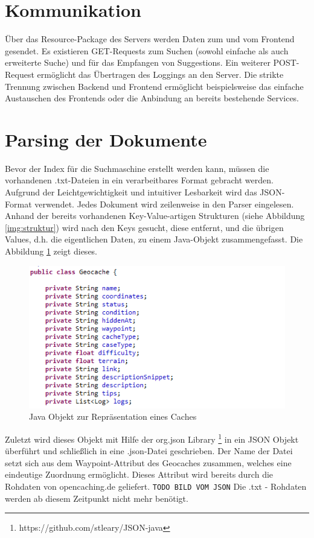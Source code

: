\documentclass[11pt,a4paper]{scrreprt}
\renewcommand\emph[1]{\colorbox{light-gray}{\texttt{#1}}}
\begin{document}
\section{Kommunikation}
Über das Resource-Package des Servers werden Daten zum und vom Frontend gesendet. Es existieren GET-Requests zum Suchen (sowohl einfache als auch erweiterte Suche) und für das Empfangen von Suggestions. Ein weiterer POST-Request ermöglicht das Übertragen des Loggings an den Server. Die strikte Trennung zwischen Backend und Frontend ermöglicht beispielsweise das einfache Austauschen des Frontends oder die Anbindung an bereits bestehende Services.

\section{Parsing der Dokumente}
Bevor der Index für die Suchmaschine erstellt werden kann, müssen die vorhandenen .txt-Dateien in ein verarbeitbares Format gebracht werden. Aufgrund der Leichtgewichtigkeit und intuitiver Lesbarkeit wird das JSON-Format verwendet.
Jedes Dokument wird zeilenweise in den Parser eingelesen. Anhand der bereits vorhandenen Key-Value-artigen Strukturen (siehe Abbildung \ref{img:struktur}) wird nach den Keys gesucht, diese entfernt, und die übrigen Values, d.h. die eigentlichen Daten, zu einem Java-Objekt zusammengefasst. Die Abbildung \ref{img:objekt} zeigt dieses. 

\begin{figure}
	\centering
	\includegraphics[height=0.3\textheight]{cache_objekt.png}
	\caption{Java Objekt zur Repräsentation eines Caches}
	\label{img:objekt}
\end{figure}

Zuletzt wird dieses Objekt mit Hilfe der org.json Library \footnote{https://github.com/stleary/JSON-java} in ein JSON Objekt überführt und schließlich in eine .json-Datei geschrieben. Der Name der Datei setzt sich aus dem Waypoint-Attribut des Geocaches zusammen, welches eine eindeutige Zuordnung ermöglicht. Dieses Attribut wird bereits durch die Rohdaten von opencaching.de geliefert. \emph{TODO BILD VOM JSON}
Die .txt - Rohdaten werden ab diesem Zeitpunkt nicht mehr benötigt.
\end{document}
